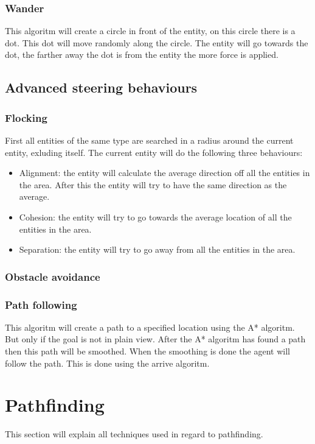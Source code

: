 \documentclass[10pt]{article}
\begin{document}
   \subsubsection {Wander}
  This algoritm will create a circle in front of the entity, on this circle there is a dot. This dot will move randomly along the circle. The entity will go towards the dot, the farther away the dot is from the entity the more force is applied. 
  \subsection{Advanced steering behaviours}
  \subsubsection {Flocking}
  First all entities of the same type are searched in a radius around the current entity, exluding itself. The current entity will do the following three behaviours: 
  \begin{itemize}
  \item Alignment: the entity will calculate the average direction off all the entities in the area. After this the entity will try to have the same direction as the average.
  \item Cohesion: the entity will try to go towards the average location of all the entities in the area.
  \item Separation: the entity  will try to go away from all the entities in the area. 
  \end{itemize}
  \subsubsection {Obstacle avoidance}
  
  \subsubsection {Path following}
   This algoritm will create a path to a specified location using the A* algoritm. But only if the goal is not in plain view. After the A* algoritm has found a path then this path will be smoothed. When the smoothing is done the agent will follow the path. This is done using the arrive algoritm. 
   \newpage
   
   \section {Pathfinding}
This section will explain all techniques used in regard to pathfinding.
\end{document}
